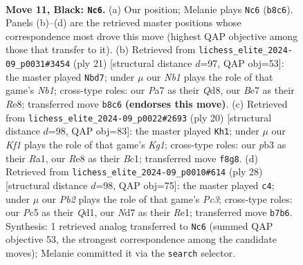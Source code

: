 \documentclass[11pt]{article}
\begin{document}
\clearpage

\begin{figure}[p]\centering
\begin{subfigure}{0.46\textwidth}\centering
\resizebox{\linewidth}{!}{%
\newchessgame
\chessboard[
  setfen={rnbqrk2/pp1nbppp/4p3/2p5/2Pp2P1/1P2PN1B/P2P1P1P/RNBQ1RK1 b - - 0 11},
  showmover=false,
  pgfstyle=straightmove, color=movearrow, markmove={b8-c6}
]}
\caption{}
\end{subfigure}\hfill
\begin{subfigure}{0.46\textwidth}\centering
\resizebox{\linewidth}{!}{%
\newchessgame
\chessboard[
  setfen={rn1qr1k1/pb2bppp/1p3n2/2pp4/3P4/1PN1PNP1/PB3PBP/R2Q1RK1 b - - 0 11},
  showmover=false,
  pgfstyle=straightmove, color=movearrow, markmove={b8-d7}
]}
\caption{}
\end{subfigure}
\\[4pt]
\begin{subfigure}{0.46\textwidth}\centering
\resizebox{\linewidth}{!}{%
\newchessgame
\chessboard[
  setfen={rn1q1rk1/pb2bppp/1p2pn2/3p4/2PP4/P1NB1P2/1P2N1PP/R1BQ1RK1 w - - 1 11},
  showmover=false,
  pgfstyle=straightmove, color=movearrow, markmove={g1-h1}
]}
\caption{}
\end{subfigure}\hfill
\begin{subfigure}{0.46\textwidth}\centering
\resizebox{\linewidth}{!}{%
\newchessgame
\chessboard[
  setfen={rn1qrbk1/1b3pp1/p1pp1n1p/1p1Pp3/4P3/1PP2N1P/P1BN1PP1/R1BQR1K1 w - - 0 15},
  showmover=false,
  pgfstyle=straightmove, color=movearrow, markmove={c3-c4}
]}
\caption{}
\end{subfigure}
\caption{\textbf{Move 11, Black: \texttt{Nc6}.} (a) Our position; Melanie plays \texttt{Nc6} (\texttt{b8c6}). Panels (b)--(d) are the retrieved master positions whose correspondence most drove this move (highest QAP objective among those that transfer to it). (b) Retrieved from \texttt{lichess\_elite\_2024-09\_p0031\#3454} (ply 21) [structural distance $d$=97, QAP obj=53]: the master played \texttt{Nbd7}; under $\mu$ our \emph{Nb1} plays the role of that game's \emph{Nb1}; cross-type roles: our \emph{P}a7 as their \emph{Q}d8, our \emph{B}e7 as their \emph{R}e8; transferred move \texttt{b8c6} \textbf{(endorses this move)}. (c) Retrieved from \texttt{lichess\_elite\_2024-09\_p0022\#2693} (ply 20) [structural distance $d$=98, QAP obj=83]: the master played \texttt{Kh1}; under $\mu$ our \emph{Kf1} plays the role of that game's \emph{Kg1}; cross-type roles: our \emph{p}b3 as their \emph{R}a1, our \emph{R}e8 as their \emph{B}c1; transferred move \texttt{f8g8}. (d) Retrieved from \texttt{lichess\_elite\_2024-09\_p0010\#614} (ply 28) [structural distance $d$=98, QAP obj=75]: the master played \texttt{c4}; under $\mu$ our \emph{Pb2} plays the role of that game's \emph{Pc3}; cross-type roles: our \emph{P}c5 as their \emph{Q}d1, our \emph{N}d7 as their \emph{R}e1; transferred move \texttt{b7b6}. Synthesis: 1 retrieved analog transferred to \texttt{Nc6} (summed QAP objective 53, the strongest correspondence among the candidate moves); Melanie committed it via the \texttt{search} selector.}
\label{fig:thought-m21}
\end{figure}
\end{document}

